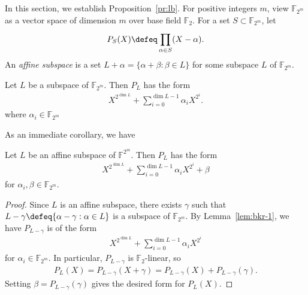 \documentclass{article}[11pt]
\begin{document}
In this section, we establish Proposition~\ref{pr:lb}.
For positive integers $m$, view $\mathbb{F}_{2^m}$ as a vector space of dimension $m$ over base field $\mathbb{F}_2$.
For a set $S\subset \mathbb{F}_{2^m}$, let
\begin{align}
  P_S(X)\defeq \prod_{\alpha\in S}^{} (X-\alpha).
  \label{}
\end{align}
An \emph{affine subspace} is a set $L+\alpha=\{\alpha+\beta:\beta\in L\}$ for some subspace $L$ of $\mathbb{F}_{2^m}$.
\begin{lemma}
  Let $L$ be a subspace of $\mathbb{F}_{2^m}$.
  Then $P_L$ has the form
  \begin{align}
    X^{2^{\dim L}} + \sum_{i=0}^{\dim L - 1} \alpha_i X^{2^i}.
  \end{align}
  where $\alpha_i \in \mathbb{F}_{2^m}$
  \label{lem:bkr-1}
\end{lemma}
As an immediate corollary, we have
\begin{lemma}
  Let $L$ be an affine subspace of $\mathbb{F}^{2^m}$.
  Then $P_L$ has the form
  \begin{align}
    X^{2^{\dim L}} + \sum_{i=0}^{\dim L - 1} \alpha_i X^{2^i} + \beta
  \end{align}
  for $\alpha_i,\beta\in \mathbb{F}_{2^m}$.
  \label{lem:bkr-2}
\end{lemma}
\begin{proof}
  Since $L$ is an affine subspace, there exists $\gamma$ such that $L - \gamma\defeq \{\alpha-\gamma:\alpha\in L\}$ is a subspace of $\mathbb{F}_{2^m}$.
  By Lemma~\ref{lem:bkr-1}, we have $P_{L-\gamma}$ is of the form
  \begin{align}
    X^{2^{\dim L}} + \sum_{i=0}^{\dim L - 1} \alpha_i X^{2^i}
  \end{align}
  for $\alpha_i\in \mathbb{F}_{2^m}$.
  In particular, $P_{L-\gamma}$ is $\mathbb{F}_2$-linear, so
  \begin{align}
    P_L(X) = P_{L-\gamma}(X+\gamma) = P_{L-\gamma}(X) + P_{L-\gamma}(\gamma).
    \label{}
  \end{align}
  Setting $\beta = P_{L-\gamma}(\gamma)$ gives the desired form for $P_L(X)$.
\end{proof}
\end{document}
